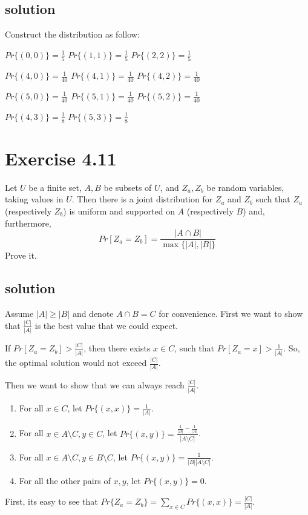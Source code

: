 \documentclass{article}
\begin{document}
\subsection{solution}
Construct the distribution as follow:

$Pr\{(0, 0)\} = \frac{1}{5}$
$Pr\{(1, 1)\} = \frac{1}{5}$
$Pr\{(2, 2)\} = \frac{1}{5}$

$Pr\{(4, 0)\} = \frac{1}{40}$
$Pr\{(4, 1)\} = \frac{1}{40}$
$Pr\{(4, 2)\} = \frac{1}{40}$

$Pr\{(5, 0)\} = \frac{1}{40}$
$Pr\{(5, 1)\} = \frac{1}{40}$
$Pr\{(5, 2)\} = \frac{1}{40}$

$Pr\{(4, 3)\} = \frac{1}{8}$
$Pr\{(5, 3)\} = \frac{1}{8}$

\section{Exercise 4.11}
Let $U$ be a finite set, $A,B$ be subsets of $U$, and $Z_a,Z_b$ be random variables, taking values in $U$. Then there is a joint distribution for $Z_a$ and $Z_b$ such that $Z_a$ (respectively $Z_b$) is uniform and supported on $A$ (respectively $B$) and, furthermore,
\[
  Pr[Z_a =Z_b]= \frac{|A\cap B|}{\max\{|A|, |B|\}}
\]
Prove it.
\subsection{solution}
Assume $|A| \geq |B|$ and denote $A\cap B = C$ for convenience.
First we want to show that $\frac{|C|}{|A|}$ is the best value that we could expect.
\begin{tcolorbox}[title={Observation}]
  If $Pr[Z_a = Z_b] > \frac{|C|}{|A|}$, then there exists $x\in C$, such that $Pr[Z_a = x] > \frac{1}{|A|}$. So, the optimal solution would not exceed $\frac{|C|}{|A|}$.
\end{tcolorbox}
Then we want to show that we can always reach $\frac{|C|}{|A|}$.
\begin{tcolorbox}
\begin{enumerate}[itemsep=0mm]
\item For all $x\in C$, let $Pr\{(x, x)\} = \frac{1}{|A|}$.
\item For all $x\in A\setminus C, y\in C$, let $Pr\{(x, y)\} = \frac{\frac{1}{|B|} - \frac{1}{|A|}}{|A\setminus C|}$.
\item For all $x\in A\setminus C, y\in B\setminus C$, let $Pr\{(x, y)\} = \frac{1}{|B||A\setminus C|}$.
\item For all the other pairs of $x, y$, let $Pr\{(x, y)\} = 0$.
\end{enumerate}
\end{tcolorbox}
First, its easy to see that $Pr\{Z_a = Z_b\} = \sum_{x\in C} Pr\{(x,x)\} = \frac{|C|}{|A|}$.
\end{document}
